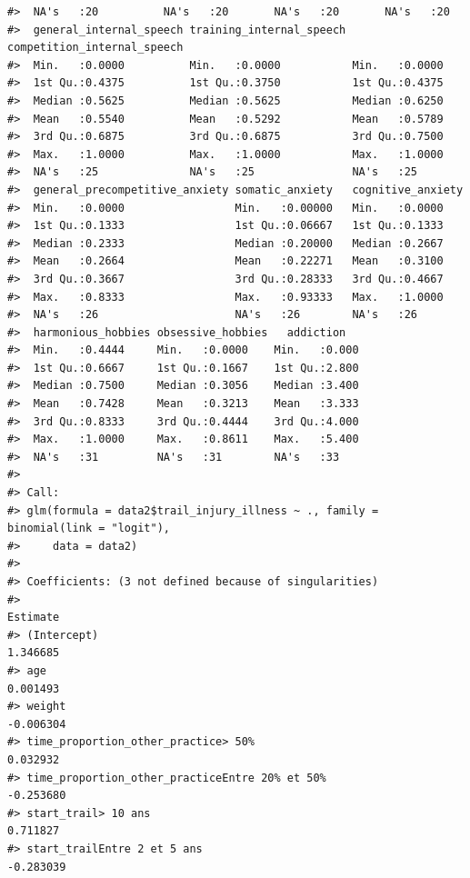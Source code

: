 \documentclass[
]{article}
\begin{document}
\begin{verbatim}
#>  NA's   :20          NA's   :20       NA's   :20       NA's   :20      
#>  general_internal_speech training_internal_speech competition_internal_speech
#>  Min.   :0.0000          Min.   :0.0000           Min.   :0.0000             
#>  1st Qu.:0.4375          1st Qu.:0.3750           1st Qu.:0.4375             
#>  Median :0.5625          Median :0.5625           Median :0.6250             
#>  Mean   :0.5540          Mean   :0.5292           Mean   :0.5789             
#>  3rd Qu.:0.6875          3rd Qu.:0.6875           3rd Qu.:0.7500             
#>  Max.   :1.0000          Max.   :1.0000           Max.   :1.0000             
#>  NA's   :25              NA's   :25               NA's   :25                 
#>  general_precompetitive_anxiety somatic_anxiety   cognitive_anxiety
#>  Min.   :0.0000                 Min.   :0.00000   Min.   :0.0000   
#>  1st Qu.:0.1333                 1st Qu.:0.06667   1st Qu.:0.1333   
#>  Median :0.2333                 Median :0.20000   Median :0.2667   
#>  Mean   :0.2664                 Mean   :0.22271   Mean   :0.3100   
#>  3rd Qu.:0.3667                 3rd Qu.:0.28333   3rd Qu.:0.4667   
#>  Max.   :0.8333                 Max.   :0.93333   Max.   :1.0000   
#>  NA's   :26                     NA's   :26        NA's   :26       
#>  harmonious_hobbies obsessive_hobbies   addiction    
#>  Min.   :0.4444     Min.   :0.0000    Min.   :0.000  
#>  1st Qu.:0.6667     1st Qu.:0.1667    1st Qu.:2.800  
#>  Median :0.7500     Median :0.3056    Median :3.400  
#>  Mean   :0.7428     Mean   :0.3213    Mean   :3.333  
#>  3rd Qu.:0.8333     3rd Qu.:0.4444    3rd Qu.:4.000  
#>  Max.   :1.0000     Max.   :0.8611    Max.   :5.400  
#>  NA's   :31         NA's   :31        NA's   :33
#> 
#> Call:
#> glm(formula = data2$trail_injury_illness ~ ., family = binomial(link = "logit"), 
#>     data = data2)
#> 
#> Coefficients: (3 not defined because of singularities)
#>                                                                                 Estimate
#> (Intercept)                                                                     1.346685
#> age                                                                             0.001493
#> weight                                                                         -0.006304
#> time_proportion_other_practice> 50%                                             0.032932
#> time_proportion_other_practiceEntre 20% et 50%                                 -0.253680
#> start_trail> 10 ans                                                             0.711827
#> start_trailEntre 2 et 5 ans                                                    -0.283039

\end{verbatim}
\end{document}
